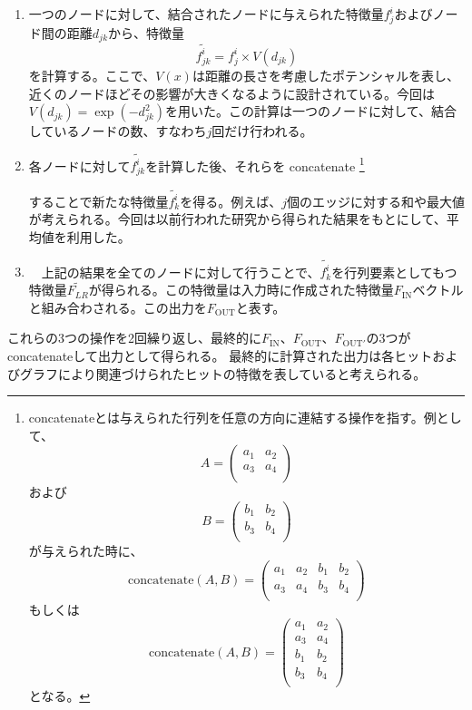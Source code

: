 \begin{enumerate}
\item  一つのノードに対して、結合されたノードに与えられた特徴量$f^{i}_{j}$およびノード間の距離$d_{jk}$から、特徴量
\begin{equation}
\tilde{f_{jk}^i} = f^i_j \times V(d_{jk})
\end{equation}
を計算する。ここで、$V(x)$は距離の長さを考慮したポテンシャルを表し、近くのノードほどその影響が大きくなるように設計されている。今回は$V(d_{jk})=\exp(-d_{jk}^2)$を用いた。この計算は一つのノードに対して、結合しているノードの数、すなわち$j$回だけ行われる。

\item 各ノードに対して$\tilde{f_{jk}^i}$を計算した後、それらを concatenate
\footnote{concatenateとは与えられた行列を任意の方向に連結する操作を指す。例として、
\[
A = \begin{pmatrix}
a_1&a_2\\
a_3&a_4\\
\end{pmatrix}
\]
および
\[
B=\begin{pmatrix}
b_1&b_2\\
b_3&b_4\\
\end{pmatrix}
\]
が与えられた時に、
\[
\mathrm{concatenate}(A, B)= 
\begin{pmatrix}
a_1&a_2&b_1&b_2\\
a_3&a_4&b_3&b_4\\
\end{pmatrix}
\]
もしくは
\[
\mathrm{concatenate}(A, B)= 
\begin{pmatrix}
a_1&a_2\\
a_3&a_4\\
b_1&b_2\\
b_3&b_4\\
\end{pmatrix}
\]
となる。
}

することで新たな特徴量$\tilde{f_k^i}$を得る。例えば、$j$個のエッジに対する和や最大値が考えられる。今回は以前行われた研究から得られた結果をもとにして、平均値を利用した。

\item 　上記の結果を全てのノードに対して行うことで、$\tilde{f_{k}^i}$を行列要素としてもつ特徴量$\tilde{F_{LR}}$が得られる。この特徴量は入力時に作成された特徴量$F_{\mathrm{IN}}$ベクトルと組み合わされる。この出力を$F_{\mathrm{OUT}}$と表す。
\end{enumerate}

これらの3つの操作を2回繰り返し、最終的に$F_{\mathrm{IN}}$、$F_{\mathrm{OUT}}$、$F_{\mathrm{OUT}'}$の3つがconcatenateして出力として得られる。
最終的に計算された出力は各ヒットおよびグラフにより関連づけられたヒットの特徴を表していると考えられる。

